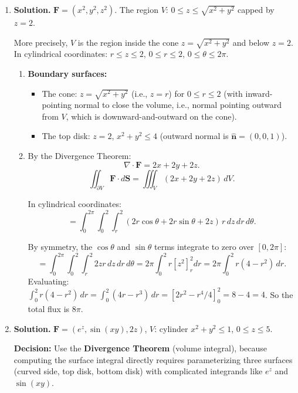 \begin{enumerate}
By symmetry, $\iiint_V x\,dV = \iiint_V y\,dV = \iiint_V z\,dV = 0$ (each is an odd function integrated over a symmetric domain).

\[
\boxed{\iiint_V(x+y+z)\,dV = 0.}
\]

\item \textbf{Solution.}
$\mathbf{F}=(x^2,y^2,z^2)$. The region $V$: $0\le z\le\sqrt{x^2+y^2}$ capped by $z=2$.

More precisely, $V$ is the region inside the cone $z=\sqrt{x^2+y^2}$ and below $z=2$. In cylindrical coordinates: $r\le z\le 2$, $0\le r\le 2$, $0\le\theta\le 2\pi$.

\begin{enumerate}
\item \textbf{Boundary surfaces:}
\begin{itemize}
\item The cone: $z=\sqrt{x^2+y^2}$ (i.e., $z=r$) for $0\le r\le 2$ (with inward-pointing normal to close the volume, i.e., normal pointing outward from $V$, which is downward-and-outward on the cone).
\item The top disk: $z=2$, $x^2+y^2\le 4$ (outward normal is $\hat{\mathbf{n}}=(0,0,1)$).
\end{itemize}

\item By the Divergence Theorem:
\[
\nabla\cdot\mathbf{F} = 2x+2y+2z.
\]
\[
\iint_{\partial V}\mathbf{F}\cdot d\mathbf{S} = \iiint_V(2x+2y+2z)\,dV.
\]

In cylindrical coordinates:
\[
= \int_0^{2\pi}\int_0^2\int_r^2(2r\cos\theta+2r\sin\theta+2z)\,r\,dz\,dr\,d\theta.
\]

By symmetry, the $\cos\theta$ and $\sin\theta$ terms integrate to zero over $[0,2\pi]$:
\[
\boxed{= \int_0^{2\pi}\int_0^2\int_r^2 2zr\,dz\,dr\,d\theta = 2\pi\int_0^2 r\left[z^2\right]_r^2 dr = 2\pi\int_0^2 r(4-r^2)\,dr.}
\]
Evaluating: $\int_0^2 r(4-r^2)\,dr = \int_0^2(4r-r^3)\,dr = [2r^2-r^4/4]_0^2 = 8-4=4$. So the total flux is $8\pi$.
\end{enumerate}

\item \textbf{Solution.}
$\mathbf{F}=(e^z, \sin(xy), 2z)$, $V$: cylinder $x^2+y^2\le 1$, $0\le z\le 5$.

\textbf{Decision:} Use the \textbf{Divergence Theorem} (volume integral), because computing the surface integral directly requires parameterizing three surfaces (curved side, top disk, bottom disk) with complicated integrands like $e^z$ and $\sin(xy)$.


\end{enumerate}
